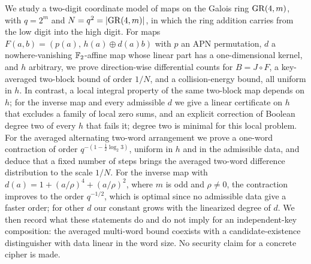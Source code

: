 We study a two-digit coordinate model of maps on the Galois ring $\mathrm{GR}(4,m)$, with $q=2^m$ and $N=q^2=|\mathrm{GR}(4,m)|$, in which the
ring addition carries from the low digit into the high digit. For maps
$F(a,b)=(p(a),\,h(a)\oplus d(a)b)$ with $p$ an APN permutation, $d$ a nowhere-vanishing
$\mathbb{F}_2$-affine map whose linear part has a one-dimensional kernel, and $h$ arbitrary, we prove
direction-wise differential counts for $B=J\circ F$, a key-averaged two-block bound of order $1/N$, and a
collision-energy bound, all uniform in $h$. In contrast, a local integral property of the same
two-block map depends on $h$; for the inverse map and every admissible $d$ we give a linear
certificate on $h$ that excludes a family of local zero sums, and an explicit correction of Boolean
degree two of every $h$ that fails it; degree two is minimal for this local problem. For the averaged
alternating two-word arrangement we prove a one-word contraction of order $q^{-(1-\frac12\log_2 3)}$, uniform in $h$ and in the
admissible data, and deduce that a fixed number of steps brings the averaged two-word difference distribution to the scale $1/N$.
For the inverse map with $d(a)=1+(a/\rho)^4+(a/\rho)^2$, where $m$ is odd and $\rho\ne0$, the contraction improves to the order
$q^{-1/2}$, which is optimal since no admissible data give a faster order; for other $d$ our constant grows with the linearized
degree of $d$.
We then record what these statements do and do not imply for an independent-key composition:
the averaged multi-word bound coexists with a candidate-existence distinguisher with data linear
in the word size. No security claim for a concrete cipher is made.
